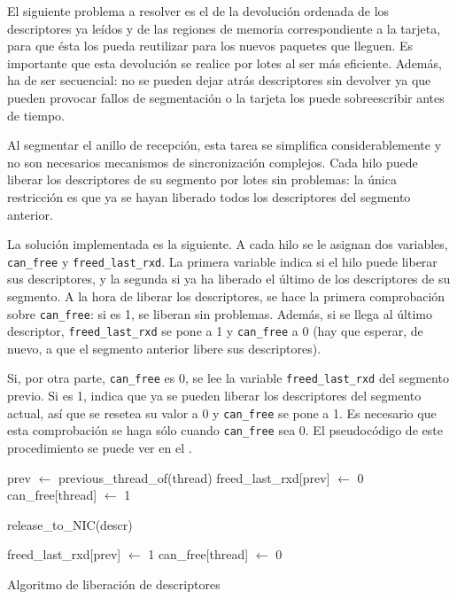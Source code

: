 \documentclass[oneside, draft]{epstfg}
\begin{document}
El siguiente problema a resolver es el de la devolución ordenada de los descriptores ya leídos y de las regiones de memoria correspondiente a la tarjeta, para que ésta los pueda reutilizar para los nuevos paquetes que lleguen. Es importante que esta devolución se realice por lotes al ser más eficiente. Además, ha de ser secuencial: no se pueden dejar atrás descriptores sin devolver ya que pueden provocar fallos de segmentación o la tarjeta los puede sobreescribir antes de tiempo.

Al segmentar el anillo de recepción, esta tarea se simplifica considerablemente y no son necesarios mecanismos de sincronización complejos. Cada hilo puede liberar los descriptores de su segmento por lotes sin problemas: la única restricción es que ya se hayan liberado todos los descriptores del segmento anterior.

La solución implementada es la siguiente. A cada hilo se le asignan dos variables, \texttt{can\_free} y \texttt{freed\_last\_rxd}. La primera variable indica si el hilo puede liberar sus descriptores, y la segunda si ya ha liberado el último de los descriptores de su segmento. A la hora de liberar los descriptores, se hace la primera comprobación sobre \texttt{can\_free}: si es 1, se liberan sin problemas. Además, si se llega al último descriptor, \texttt{freed\_last\_rxd} se pone a 1 y \texttt{can\_free} a 0 (hay que esperar, de nuevo, a que el segmento anterior libere sus descriptores).

Si, por otra parte, \texttt{can\_free} es 0, se lee la variable \texttt{freed\_last\_rxd} del segmento previo. Si es 1, indica que ya se pueden liberar los descriptores del segmento actual, así que se resetea su valor a 0 y \texttt{can\_free} se pone a 1. Es necesario que esta comprobación se haga sólo cuando \texttt{can\_free} sea 0. El pseudocódigo de este procedimiento se puede ver en el .

\begin{algorithm}[hbtp]
\begin{algorithmic}
\State prev $\gets$ previous\_thread\_of(thread)
		\State freed\_last\_rxd[prev] $\gets$ 0
		\State can\_free[thread] $\gets$ 1
	\EndIf

		\State release\_to\_NIC(descr)

			\State freed\_last\_rxd[prev] $\gets$ 1
			\State can\_free[thread] $\gets$ 0
		\EndIf
	\EndIf
\EndFunction
\end{algorithmic}
\caption{Algoritmo de liberación de descriptores}
\label{lst:AlgoritmoDescriptores}
\end{algorithm}
\end{document}
